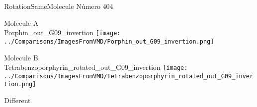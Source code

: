 \vtab[-3cm]
\begin{center}
{\large RotationSameMolecule \tab Número 404}
\end{center}
\begin{multicols}{2}
\begin{center}
Molecule A \\ 
Porphin\_out\_G09\_invertion
\texttt{[image: ../Comparisons/ImagesFromVMD/Porphin\_out\_G09\_invertion.png]}
\\
\vtab

\columnbreak
Molecule B \\ 
Tetrabenzoporphyrin\_rotated\_out\_G09\_invertion
\texttt{[image: ../Comparisons/ImagesFromVMD/Tetrabenzoporphyrin\_rotated\_out\_G09\_invertion.png]}
\\
\vtab


\end{center}
\end{multicols}
\begin{center}
\textcolor{NavyBlue}{\Large Different}
\end{center}

 \newpage

